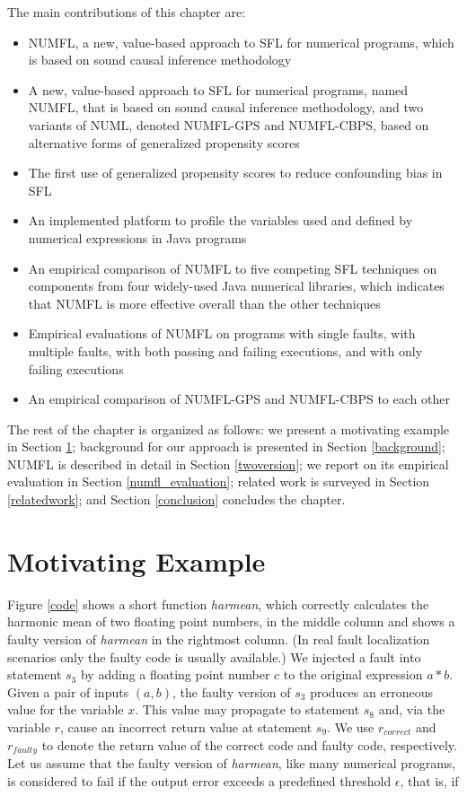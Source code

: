 The main contributions of this chapter are:
\vspace{-0.2cm}
\begin{itemize}
\item NUMFL, a new, value-based approach to SFL for numerical programs, which is based on sound causal inference methodology
	\item A new, value-based approach to SFL for numerical programs, named NUMFL, that is based on sound causal inference methodology, and two variants of NUML, denoted NUMFL-GPS and NUMFL-CBPS, based on alternative forms of generalized propensity scores
	\item The first use of generalized propensity scores to reduce confounding bias in SFL
	\item An implemented platform to profile the variables used and defined by numerical expressions in Java programs
\item An empirical comparison of NUMFL to five competing SFL techniques on components from four widely-used Java numerical libraries, which indicates that NUMFL is more effective overall than the other techniques
    \item Empirical evaluations of NUMFL on programs with single faults, with multiple faults, with both passing and failing executions, and with only failing executions
\item	An empirical comparison of NUMFL-GPS and NUMFL-CBPS to each other
\end{itemize}

The rest of the chapter is organized as follows: we present a motivating example in Section \ref{motivating}; background for our approach is presented in Section \ref{background}; NUMFL is described in detail in Section \ref{twoversion};  we report on its empirical evaluation in Section \ref{numfl_evaluation}; related work is surveyed in Section \ref{relatedwork}; and Section \ref{conclusion} concludes the chapter.

\section{Motivating Example}\label{motivating}

Figure \ref{code} shows a short function {\it harmean}, which correctly calculates the harmonic mean of two floating point numbers, in the middle column and shows a faulty version of {\it harmean} in the rightmost column.  (In real fault localization scenarios only the faulty code is usually available.)  We injected a fault into statement $s_3$ by adding a floating point number $c$ to the original expression $a*b$.  Given a pair of inputs $(a,b)$, the faulty version of $s_3$ produces an erroneous value for the variable $x$.  This value may propagate to statement $s_8$ and, via the variable $r$, cause an incorrect return value at statement $s_9$.  We use $r_{correct}$ and $r_{faulty}$ to denote the return value of the correct code and faulty code, respectively.  Let us assume that the faulty version of {\it harmean}, like many numerical programs, is considered to fail if the output error exceeds a predefined threshold $\epsilon$, that is, if

